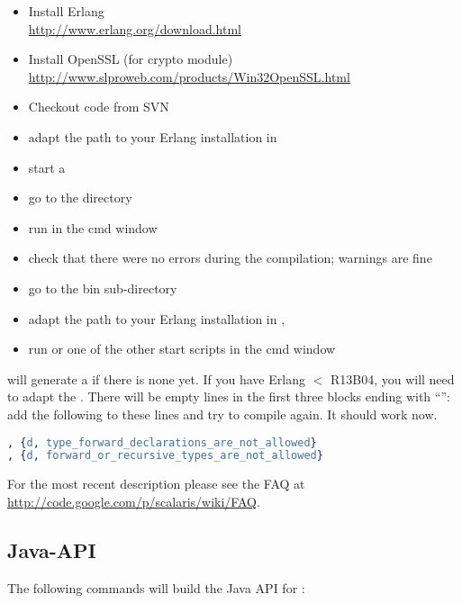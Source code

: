 \begin{itemize}
\item Install Erlang\\
       \url{http://www.erlang.org/download.html}
\item Install OpenSSL (for crypto module)\\
       \url{http://www.slproweb.com/products/Win32OpenSSL.html}
\item Checkout \scalaris{} code from SVN
\item adapt the path to your Erlang installation in 
\item start a 
\item go to the \scalaris{} directory
\item run  in the cmd window
\item check that there were no errors during the compilation;
       warnings are fine
\item go to the bin sub-directory
\item adapt the path to your Erlang installation in ,
\item run  or one of the other start scripts in the cmd window
\end{itemize}

 will generate a  if there is none yet.
If you have Erlang $<$ R13B04, you will need to adapt the .
There will be empty lines in the first three blocks ending with
``\code{ ]\}.}'': add the following to these lines and try to compile again.
It should work now.

\begin{lstlisting}[language=erlang]
, {d, type_forward_declarations_are_not_allowed}
, {d, forward_or_recursive_types_are_not_allowed}
\end{lstlisting}

For the most recent description please see the FAQ at
\url{http://code.google.com/p/scalaris/wiki/FAQ}.

\subsection{Java-API}

The following commands will build the Java API for \scalaris{}:
\begin{lstlisting}[language=sh]
%> make java
\end{lstlisting}

